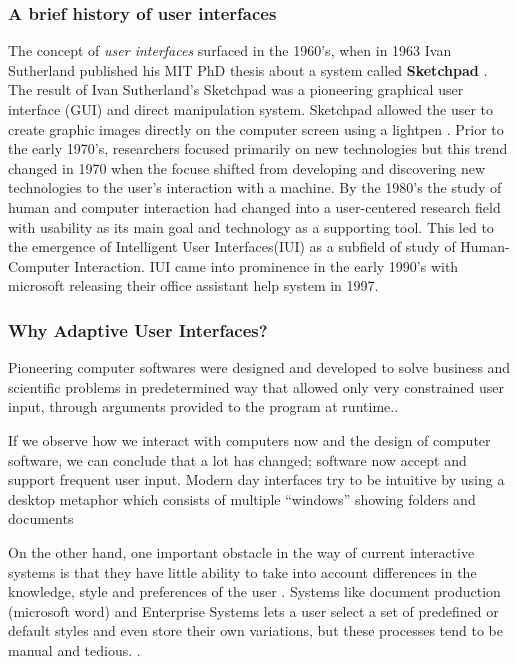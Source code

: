 \subsubsection{A brief history of user interfaces} \label{sub:history}
The concept of \emph{user interfaces} surfaced in the 1960's, when in 1963 Ivan Sutherland published his MIT PhD thesis about a system called \textbf{Sketchpad} \cite{sutherland1964sketch}.
The result of Ivan Sutherland's Sketchpad was a pioneering graphical user interface (GUI) and direct manipulation system. Sketchpad allowed the user to create graphic images directly on the computer screen using a lightpen \cite{patrick2003intelligent}.
Prior to the early 1970's, researchers focused primarily on new technologies but this trend changed in 1970 when the focuse shifted from developing and discovering new technologies to the user's interaction with a machine.
By the 1980's the study of human and computer interaction had changed into a user-centered research field with usability as its main goal and technology as a supporting tool.\cite{patrick2003intelligent}
This led to the emergence of Intelligent User Interfaces(IUI) as a subfield of study of Human-Computer Interaction. IUI came into prominence in the early 1990's with microsoft releasing their office assistant help system in 1997.
\subsubsection{Why Adaptive User Interfaces?}
Pioneering computer softwares were designed and developed to solve business and scientific problems in predetermined way that allowed only very constrained user input, through arguments provided to the program at runtime.\cite{langley1997machine}.

If we observe how we interact with computers now and the design of computer software, we can conclude that a lot has changed; software now accept and support frequent user input. Modern day interfaces try to be intuitive by using a desktop metaphor which consists of multiple ``windows'' showing folders and documents \cite{patrick2003intelligent}

On the other hand, one important obstacle in the way of current interactive systems is that they have little ability to take into account differences in the knowledge, style and preferences of the user \cite{langley1997machine}.
Systems like document production (microsoft word) and Enterprise Systems lets a user select a set of predefined or default styles and even store their own variations, but these processes tend to be manual and tedious. \cite{langley1997machine}.


